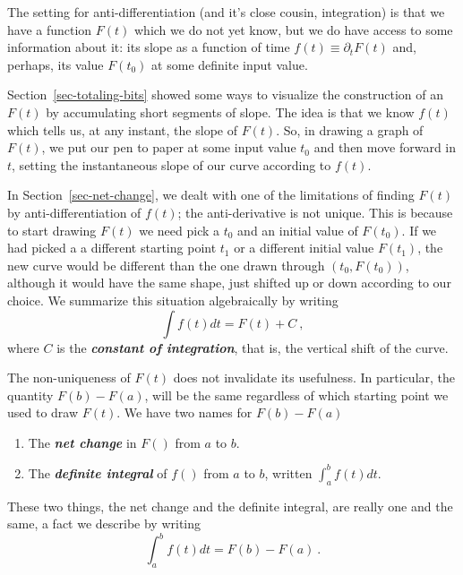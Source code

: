 \documentclass[
  letterpaper,
  DIV=11,
  numbers=noendperiod,
  oneside]{scrreprt}
\providecommand{\tightlist}{%
  \setlength{\itemsep}{0pt}\setlength{\parskip}{0pt}}
\begin{document}
The setting for anti-differentiation (and it's close cousin,
integration) is that we have a function \(F(t)\) which we do not yet
know, but we do have access to some information about it: its slope as a
function of time \(f(t) \equiv \partial_t F(t)\) and, perhaps, its value
\(F(t_0)\) at some definite input value.

Section~\ref{sec-totaling-bits} showed some ways to visualize the
construction of an \(F(t)\) by accumulating short segments of slope. The
idea is that we know \(f(t)\) which tells us, at any instant, the slope
of \(F(t)\). So, in drawing a graph of \(F(t)\), we put our pen to paper
at some input value \(t_0\) and then move forward in \(t\), setting the
instantaneous slope of our curve according to \(f(t)\).

In Section~\ref{sec-net-change}, we dealt with one of the limitations of
finding \(F(t)\) by anti-differentiation of \(f(t)\); the
anti-derivative is not unique. This is because to start drawing \(F(t)\)
we need pick a \(t_0\) and an initial value of \(F(t_0)\). If we had
picked a a different starting point \(t_1\) or a different initial value
\(F(t_1)\), the new curve would be different than the one drawn through
\((t_0, F(t_0))\), although it would have the same shape, just shifted
up or down according to our choice. We summarize this situation
algebraically by writing \[\int f(t) dt = F(t) + C\ ,\] where \(C\) is
the \textbf{\emph{constant of integration}}, that is, the vertical shift
of the curve.

The non-uniqueness of \(F(t)\) does not invalidate its usefulness. In
particular, the quantity \(F(b) - F(a)\), will be the same regardless of
which starting point we used to draw \(F(t)\). We have two names for
\(F(b) - F(a)\)

\begin{enumerate}
\def\labelenumi{\arabic{enumi}.}
\tightlist
\item
  The \textbf{\emph{net change}} in \(F()\) from \(a\) to \(b\).
\item
  The \textbf{\emph{definite integral}} of \(f()\) from \(a\) to \(b\),
  written \(\int_a^b f(t) dt\).
\end{enumerate}

These two things, the net change and the definite integral, are really
one and the same, a fact we describe by writing
\[\int_a^b f(t) dt = F(b) - F(a)\ .\]
\end{document}
